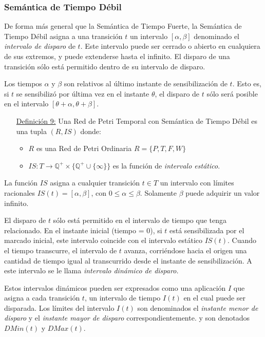 \subsubsection{Semántica de Tiempo Débil}

De forma más general que la Semántica de Tiempo Fuerte, la Semántica de
Tiempo Débil asigna a una transición $t$ un intervalo $[\alpha, \beta]$
denominado el \textit{intervalo de disparo} de $t$. Este intervalo puede ser cerrado o
abierto en cualquiera de sus extremos, y puede extenderse hasta el infinito. El
disparo de una transición sólo está permitido dentro de su intervalo de disparo.

Los tiempos $\alpha$ y $\beta$ son relativos al último instante de
sensibilización de $t$.
Esto es, si $t$ se sensibilizó por última vez en el instante $\theta$, el
disparo de $t$ sólo será posible en el intervalo $[\theta + \alpha, \theta
+ \beta]$. \cite{PetriNetsFundamentals}

\begin{itemize}
  \item [\underline{Definición 9:}] Una Red de Petri Temporal con Semántica de
  Tiempo Débil es una tupla $(R, IS)$ donde:
  \begin{itemize}
    \item $R$ es una Red de Petri Ordinaria $R = \{P, T, F, W \}$
    \item $IS: T \rightarrow \mathbb{Q^{+}} \times \{ \mathbb{Q^{+}} \cup \{
    \infty \} \}$ es la función de \textit{intervalo estático}.
  \end{itemize}
\end{itemize}

La función $IS$ asigna a cualquier transición $t \in T$ un intervalo con límites
racionales $IS(t) = [\alpha, \beta]$, con $0 \leq \alpha \leq \beta$. Solamente
$\beta$ puede adquirir un valor infinito.

El disparo de $t$ sólo está permitido en el intervalo de tiempo que tenga
relacionado. En el instante inicial (tiempo = 0), si $t$ está sensibilizada por
el marcado inicial, este intervalo coincide con el intervalo estático $IS(t)$.
Cuando el tiempo transcurre, el intervalo de $t$ avanza, corriéndose hacia el
origen una cantidad de tiempo igual al transcurrido desde el instante de
sensibilización. A este intervalo se le llama \textit{intervalo dinámico de disparo.}

Estos intervalos dinámicos pueden ser expresados como una aplicación $I$ que
asigna a cada transición $t$, un intervalo de tiempo $I(t)$ en el cual puede ser
disparada. Los límites del intervalo $I(t)$ son denominados el \textit{instante
menor de disparo} y el \textit{instante mayor de disparo}
correspondientemente. y son denotados $DMin(t)$ y
$DMax(t)$.\cite{PetriNetsFundamentals}

